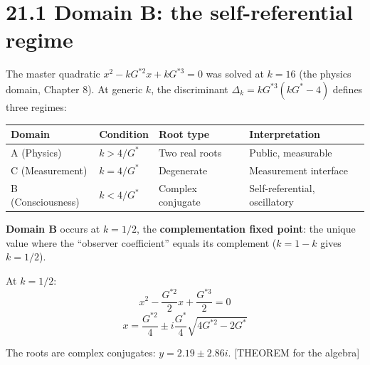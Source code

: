 \documentclass[
  11pt,
  letterpaper,
  twoside,
  openright]{book}
\begin{document}
\section{21.1 Domain B: the self-referential
regime}\label{domain-b-the-self-referential-regime}

The master quadratic \(x^2 - kG^{*2}x + kG^{*3} = 0\) was solved at
\(k = 16\) (the physics domain, Chapter 8). At generic \(k\), the
discriminant \(\Delta_k = kG^{*3}(kG^* - 4)\) defines three regimes:

\begin{longtable}[]{@{}
  >{\raggedright\arraybackslash}p{}
  >{\raggedright\arraybackslash}p{}
  >{\raggedright\arraybackslash}p{}
  >{\raggedright\arraybackslash}p{}@{}}
\toprule\noalign{}
\begin{minipage}[b]{\linewidth}\raggedright
Domain
\end{minipage} & \begin{minipage}[b]{\linewidth}\raggedright
Condition
\end{minipage} & \begin{minipage}[b]{\linewidth}\raggedright
Root type
\end{minipage} & \begin{minipage}[b]{\linewidth}\raggedright
Interpretation
\end{minipage} \\
\midrule\noalign{}
\endhead
\bottomrule\noalign{}
\endlastfoot
A (Physics) & \(k > 4/G^*\) & Two real roots & Public, measurable \\
C (Measurement) & \(k = 4/G^*\) & Degenerate & Measurement interface \\
B (Consciousness) & \(k < 4/G^*\) & Complex conjugate &
Self-referential, oscillatory \\
\end{longtable}

\textbf{Domain B} occurs at \(k = 1/2\), the \textbf{complementation
fixed point}: the unique value where the ``observer coefficient'' equals
its complement (\(k = 1 - k\) gives \(k = 1/2\)).

At \(k = 1/2\): \[
x^2 - \frac{G^{*2}}{2}x + \frac{G^{*3}}{2} = 0
\] \[
x = \frac{G^{*2}}{4} \pm i\frac{G^*}{4}\sqrt{4G^{*2} - 2G^*}
\]

The roots are complex conjugates: \(y = 2.19 \pm 2.86i\). {[}THEOREM for
the algebra{]}
\end{document}

